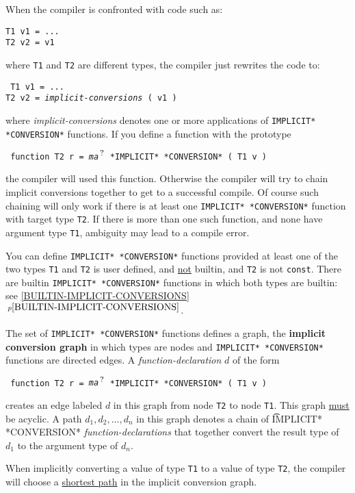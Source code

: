 \documentclass[12pt]{article}
\newcommand{\QMARK}{{$^{\,\mbox{\footnotesize ?}}$}}
\newcommand{\key}[1]{{\rm \bfseries #1}}
\newcommand{\itemref}[1]{\ref{#1}$\,^{p\pageref{#1}}$}
\newenvironment{indpar}[1][0.3in]%
	{\begin{list}{}%
		     {\setlength{\itemsep}{0in}%
		      \setlength{\topsep}{0in}%
		      \setlength{\parsep}{1ex}%
		      \setlength{\labelwidth}{#1}%
		      \setlength{\leftmargin}{#1}%
		      \addtolength{\leftmargin}{\labelsep}}%
	 \item}%
	{\end{list}}
\begin{document}
When the compiler is confronted with code such as:
\begin{indpar}\begin{verbatim}
T1 v1 = ...
T2 v2 = v1
\end{verbatim}\end{indpar}
where {\tt T1} and {\tt T2} are different types,
the compiler just rewrites the code to:
\begin{indpar}\tt
T1 v1 = ... \\
T2 v2 = {\rm \em implicit-conversions} ( v1 )
\end{indpar}
where {\em implicit-conversions} denotes one or more applications
of {\tt *IMPLICIT* *CONVERSION*} functions.
If you define a function
with the prototype
\begin{indpar} \tt
function T2 r = {\em ma}\QMARK{} *IMPLICIT* *CONVERSION* ( T1 v )
\end{indpar}
the compiler will used this function.  Otherwise the compiler
will try to chain implicit conversions together to get to a
successful compile.  Of course such chaining will only work
if there is at least one {\tt *IMPLICIT* *CONVERSION*} function with
target type {\tt T2}.  If there is more than one such function,
and none have argument type {\tt T1}, ambiguity may lead to a compile error.

You can define {\tt *IMPLICIT* *CONVERSION*} functions
provided at least one of the two types {\tt T1} and {\tt T2}
is user defined, and \underline{not} builtin, and {\tt T2} is not {\tt const}.
There are builtin {\tt *IMPLICIT* *CON\-VER\-SION*} functions in
which both types are builtin: see \itemref{BUILTIN-IMPLICIT-CONVERSIONS}.

The set of {\tt *IMPLICIT* *CONVERSION*} functions defines
a graph, the \key{implicit conversion graph}\label{IMPLICIT-CONVERSION-GRAPH}
in which types are nodes and {\tt *IMPLICIT* *CONVERSION*}
functions are directed edges.
A {\em function-declaration} $d$ of the form
\begin{indpar} \tt
function T2 r = {\em ma}\QMARK{} *IMPLICIT* *CONVERSION* ( T1 v )
\end{indpar}
creates an edge labeled $d$ in this graph from node {\tt T2} to node
{\tt T1}.
This graph \underline{must} be
acyclic.  A path $d_1,d_2,\ldots,d_n$ in this graph denotes a chain
of {\t *IMPLICIT* *CONVERSION*} {\em function-declarations} that together
convert the result type of $d_1$ to the argument type of $d_n$.

When implicitly converting a value of type {\tt T1} to a value of
type {\tt T2}, the compiler will choose a \underline{shortest path}
in the implicit conversion graph.
\end{document}

